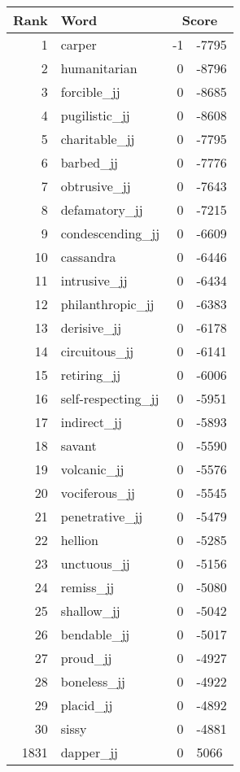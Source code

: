 \begin{longtable}[!htbp]{| rlr@{.}l |}
    \hline
    \textbf{Rank} & \textbf{Word} & \multicolumn{2}{c|}{\textbf{Score}} \\
    \hline
    \endhead
    1 & carper & -1 & -7795 \\
    2 & humanitarian & 0 & -8796 \\
    3 & forcible\_jj & 0 & -8685 \\
    4 & pugilistic\_jj & 0 & -8608 \\
    5 & charitable\_jj & 0 & -7795 \\
    6 & barbed\_jj & 0 & -7776 \\
    7 & obtrusive\_jj & 0 & -7643 \\
    8 & defamatory\_jj & 0 & -7215 \\
    9 & condescending\_jj & 0 & -6609 \\
    10 & cassandra & 0 & -6446 \\
    11 & intrusive\_jj & 0 & -6434 \\
    12 & philanthropic\_jj & 0 & -6383 \\
    13 & derisive\_jj & 0 & -6178 \\
    14 & circuitous\_jj & 0 & -6141 \\
    15 & retiring\_jj & 0 & -6006 \\
    16 & self-respecting\_jj & 0 & -5951 \\
    17 & indirect\_jj & 0 & -5893 \\
    18 & savant & 0 & -5590 \\
    19 & volcanic\_jj & 0 & -5576 \\
    20 & vociferous\_jj & 0 & -5545 \\
    21 & penetrative\_jj & 0 & -5479 \\
    22 & hellion & 0 & -5285 \\
    23 & unctuous\_jj & 0 & -5156 \\
    24 & remiss\_jj & 0 & -5080 \\
    25 & shallow\_jj & 0 & -5042 \\
    26 & bendable\_jj & 0 & -5017 \\
    27 & proud\_jj & 0 & -4927 \\
    28 & boneless\_jj & 0 & -4922 \\
    29 & placid\_jj & 0 & -4892 \\
    30 & sissy & 0 & -4881 \\
    1831 & dapper\_jj & 0 & 5066 \\

\end{longtable}
